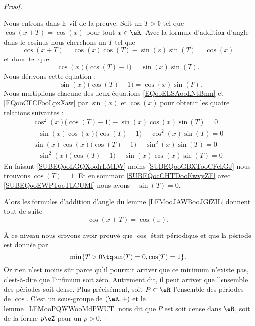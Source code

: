 \begin{proof}
\begin{subproof}
		Nous entrons dans le vif de la preuve. Soit un \( T>0\) tel que \( \cos(x+T)=\cos(x)\) pour tout \( x\in \eR\). Avec la formule d'addition d'angle dans le cosinus nous cherchons un \( T\) tel que
		\begin{equation}
			\cos(x+T)=\cos(x)\cos(T)-\sin(x)\sin(T)=\cos(x)
		\end{equation}
		et donc tel que
		\begin{equation}        \label{EQooELSAooLNtBnm}
			\cos(x)\big( \cos(T)-1 \big)=\sin(x)\sin(T).
		\end{equation}
		Nous dérivons cette équation :
		\begin{equation}        \label{EQooCECFooLpxXaw}
			-\sin(x)\big( \cos(T)-1 \big)=\cos(x)\sin(T).
		\end{equation}
		Nous multiplions chacune des deux équations \eqref{EQooELSAooLNtBnm} et \eqref{EQooCECFooLpxXaw} par \( \sin(x)\) et \( \cos(x)\) pour obtenir les quatre relations suivantes :
		\begin{subequations}
			\begin{align}
				\cos^2(x)\big( \cos(T)-1 \big)-\sin(x)\cos(x)\sin(T)=0      \label{SUBEQooLGQXooIrLMLW} \\
				-\sin(x)\cos(x)\big( \cos(T)-1 \big)-\cos^2(x)\sin(T)=0     \label{SUBEQooCHTDooKwvyZF} \\
				\sin(x)\cos(x)\big( \cos(T)-1 \big)-\sin^2(x)\sin(T)=0      \label{SUBEQooEWPTooTLCUMf} \\
				-\sin^2(x)\big( \cos(T)-1 \big)-\sin(x)\cos(x)\sin(T)=0     \label{SUBEQooGBXTooCFekGJ}
			\end{align}
		\end{subequations}
		En faisant \eqref{SUBEQooLGQXooIrLMLW} moins \eqref{SUBEQooGBXTooCFekGJ} nous trouvons \( \cos(T)=1\). Et en sommant \eqref{SUBEQooCHTDooKwvyZF} avec \eqref{SUBEQooEWPTooTLCUMf} nous avons \( -\sin(T)=0\).

		\spitem[Si \( T>0\) est tel que \( \sin(T)=0\) et \( \cos(T)=1\)]
		Alors les formules d'addition d'angle du lemme \ref{LEMooJAWBooJGfZIL} donnent tout de suite
		\begin{equation}
			\cos(x+T)=\cos(x).
		\end{equation}

	\end{subproof}

	À ce niveau nous croyons avoir prouvé que \( \cos\) était périodique et que la période est donnée par
	\begin{equation}
		\min\{ T>0\tq \sin(T)=0,\cos(T)=1 \}.
	\end{equation}
	Or rien n'est moins sûr parce qu'il pourrait arriver que ce minimum n'existe pas, c'est-à-dire que l'infimum soit zéro. Autrement dit, il peut arriver que l'ensemble des périodes soit dense. Plus précisément, soit \( P\subset \eR\) l'ensemble des périodes de \( \cos\). C'est un sous-groupe de \( (\eR,+)\) et le lemme~\ref{LEMooPQWWooMdPWUT} nous dit que \( P\) est soit dense dans \( \eR\), soit de la forme \( p\eZ\) pour un \( p>0\).


\end{proof}
